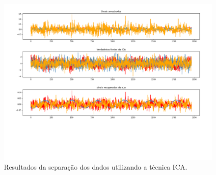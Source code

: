 \begin{figure}[H]
    \caption{Resultados da separação dos dados utilizando a técnica ICA.}
    \begin{center}
        \includegraphics[scale=.4]{resultados/img/ica.png}
    \end{center}
    \label{fig:}
\end{figure}